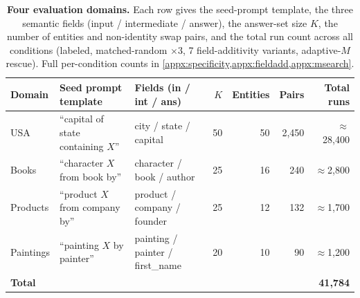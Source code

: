 \begin{table}[t]
\centering
\small
\caption{\textbf{Four evaluation domains.} Each row gives the seed-prompt template, the three semantic fields (input / intermediate / answer), the answer-set size $K$, the number of entities and non-identity swap pairs, and the total run count across all conditions (labeled, matched-random $\times 3$, 7 field-additivity variants, adaptive-$M$ rescue). Full per-condition counts in \cref{appx:specificity,appx:fieldadd,appx:msearch}.}
\label{tab:domains}
\begin{tabular}{llp{3.4cm}rrrr}
\toprule
Domain & Seed prompt template & Fields (in / int / ans) & $K$ & Entities & Pairs & Total runs \\
\midrule
USA       & ``capital of state containing $X$'' & city / state / capital       & 50 & 50 & 2{,}450 & $\approx$28{,}400 \\
Books     & ``character $X$ from book by''      & character / book / author    & 25 & 16 & 240     & $\approx$2{,}800  \\
Products  & ``product $X$ from company by''     & product / company / founder  & 25 & 12 & 132     & $\approx$1{,}700  \\
Paintings & ``painting $X$ by painter''          & painting / painter / first\_name & 20 & 10 & 90  & $\approx$1{,}200  \\
\midrule
\multicolumn{6}{l}{\textbf{Total}} & \textbf{41{,}784} \\
\bottomrule
\end{tabular}
\end{table}
